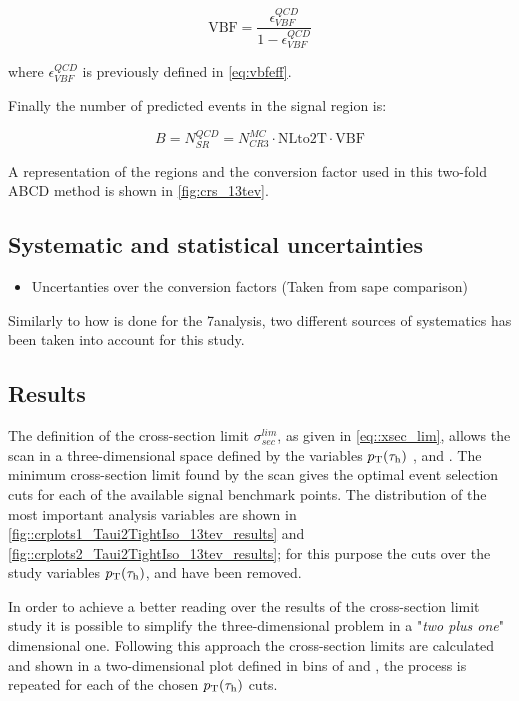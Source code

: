 \begin{equation}
\text{VBF} = \frac{\epsilon^{QCD}_{VBF}}{1 - \epsilon^{QCD}_{VBF}}
\end{equation}

where $\epsilon^{QCD}_{VBF}$ is previously defined in \autoref{eq:vbfeff}. 

Finally the number of predicted events in the signal region is:

\begin{equation}
B = N^{QCD}_{SR} = N^{MC}_{CR3}  \cdot \text{NLto2T} \cdot \text{VBF}
\label{eq::qcdbgpred_13tev}
\end{equation}

A representation of the regions and the conversion factor used in this two-fold ABCD method is shown in \autoref{fig:crs_13tev}.

\subsection{Systematic and statistical uncertainties}
\begin{itemize}
		\item Uncertanties over the conversion factors (Taken from sape comparison)
\end{itemize}

Similarly to how is done for the 7\tev analysis, two different sources of systematics has been taken into account for this study.

\subsection{Results}

The definition of the cross-section limit $\sigma^{lim}_{sec}$, as given in \autoref{eq::xsec_lim}, allows the scan in a three-dimensional space defined by the variables $p_{\text{T}}(\tau_{\text{h}})$ , \mjj and \met. The minimum cross-section limit found by the scan gives the optimal event selection cuts for each of the available signal benchmark points. The distribution of the most important analysis variables are shown in \autoref{fig::crplots1_Taui2TightIso_13tev_results} and \autoref{fig::crplots2_Taui2TightIso_13tev_results}; for this purpose the cuts over the study variables $p_{\text{T}}(\tau_{\text{h}})$, \mjj and \met have been removed. 

In order to achieve a better reading over the results of the cross-section limit study it is possible to simplify the three-dimensional problem in a "\textit{two plus one}" dimensional one. Following this approach the cross-section limits are calculated and shown in a two-dimensional plot defined in bins of \mjj and \met, the process is repeated for each of the chosen $p_{\text{T}}(\tau_{\text{h}})$ cuts.

